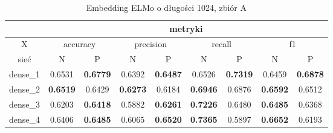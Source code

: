 \begin{table}[p]  \centering
    \caption{Embedding ELMo o długości 1024, zbiór A}
    \label{tab:wyniki_elmo_A}
    \begin{tabular}{|c|c|c|c|c|c|c|c|c|}    \hline
                 & \multicolumn{8}{c|}{metryki}                                                                                                                                                                                                                                                                                  \\ \hline
        X        & \multicolumn{2}{c|}{accuracy}       & \multicolumn{2}{c|}{precision}      & \multicolumn{2}{c|}{recall}         & \multicolumn{2}{c|}{f1}                                                                                                                                                                     \\ \hline
        sieć     & N                                   & P                                   & N                                   & P                                   & N                                   & P                                   & N                                   & P                                   \\ \hline
        dense\_1 & 0.6531                              & \textbf{0.6779}                     & 0.6392                              & \textbf{0.6487}                     & 0.6526                              & \textbf{0.7319}                     & 0.6459                              & \textbf{0.6878}                     \\ \hline
        dense\_2 & \textbf{0.6519}                     & 0.6429                              & \textbf{0.6273}                     & 0.6184                              & \textbf{0.6946}                     & 0.6876                              & \textbf{0.6592}                     & 0.6512                              \\ \hline
        dense\_3 & 0.6203                              & \textbf{0.6418}                     & 0.5882                              & \textbf{0.6261}                     & \textbf{0.7226}                     & 0.6480                              & \textbf{0.6485}                     & 0.6368                              \\ \hline
        dense\_4 & 0.6406                              & \textbf{0.6485}                     & 0.6065                              & \textbf{0.6520}                     & \textbf{0.7365}                     & 0.5897                              & \textbf{0.6652}                     & 0.6193                              \\ \hline

\end{tabular}
\end{table}
